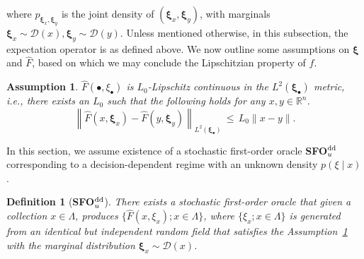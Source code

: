 \documentclass[11pt,reqno]{amsart}
\newcommand{\1}{{\bf 1}}
\newcommand{\2}{{\bf 2}}
\newcommand{\mr}[1]{{\color{blue}#1}}
\newcommand{\pc}[1]{{\color{cyan}#1}}
\newcommand{\us}[1]{\textcolor{red}{#1}}
\newcommand{\bxi}{\boldsymbol{\xi}}
\newcommand{\R}{\mathbb R}
\newcommand{\laa}{\Lambda}
\newcommand{\lnn}{\left\|}
\newcommand{\rnn}{\right\|}
\numberwithin{equation}{section}
\newtheorem{definition}{Definition}[section]
\newtheorem{assumption}{Assumption}[section]
\theoremstyle{remark}
\begin{document}
{\begin{equation}
					\end{equation}
					where $p_{\bxi_x, \bxi_y}$ is the joint density of $(\bxi_x,\bxi_y)$, with marginals $\bxi_x \sim \mathcal{D}(x),\bxi_y \sim \mathcal{D}(y)$.
					Unless mentioned otherwise, in this subsection, the expectation operator is as defined above. We now outline some assumptions on $\bxi$ and $\hat{F}$, {based on which we may conclude}  the Lipschitzian property of $f$. %
					\begin{assumption}\label{asm:randomfield}
						$\hat{F}(\bullet,\xi_\bullet)$ is $L_0$-Lipschitz continuous in the $L^2(\bxi_\bullet)$ metric, i.e., there exists an $L_0$ such that the following holds for any $x, y \in \R^n$.
						$$
						{\lnn \hat{F}(x, \bxi_x) - \hat{F}(y, \bxi_y) \rnn}_{L^2(\bxi_\bullet)} \, \leq \, L_0 \|x-y\|.
						$$  
					\end{assumption}
					
					In this section, we assume existence of a stochastic first-order oracle {\bf SFO$^{\rm dd}_u$} corresponding to a decision-dependent regime with an unknown density $p(\xi\mid x)$.\\
					
					\begin{definition} [{\bf SFO$^{\rm dd}_u$}] \label{sfo-ddu} There exists a stochastic first-order oracle that given {a collection $x\in {\laa}$, produces $\{ \hat{F}(x,\xi_x); x \in {\laa} \}$},  where {$\{\xi_x ; x \in {\laa} \}$} is generated from an identical but independent random field that satisfies the Assumption~\ref{asm:randomfield} with the marginal distribution $\bxi_x \sim \mathcal{D}(x)$.  %
					\end{definition}
					
				
}
\end{document}
